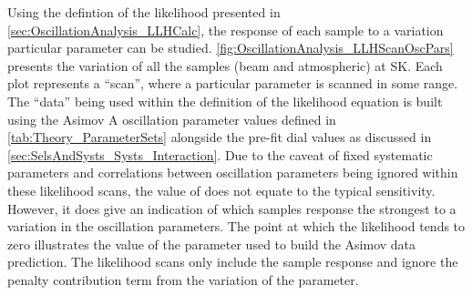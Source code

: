 Using the defintion of the likelihood presented in \autoref{sec:OscillationAnalysis_LLHCalc}, the response of each sample to a variation particular parameter can be studied. \autoref{fig:OscillationAnalysis_LLHScanOscPars} presents the variation of all the samples (beam and atmospheric) at SK. Each plot represents a ``scan'', where a particular parameter is scanned in some range. The ``data'' being used within the definition of the likelihood equation is built using the Asimov A oscillation parameter values defined in \autoref{tab:Theory_ParameterSets} alongside the pre-fit dial values as discussed in \autoref{sec:SelsAndSysts_Systs_Interaction}. Due to the caveat of fixed systematic parameters and correlations between oscillation parameters being ignored within these likelihood scans, the value of  does not equate to the typical \quickmath{1\sigma} sensitivity. However, it does give an indication of which samples response the strongest to a variation in the oscillation parameters. The point at which the likelihood tends to zero illustrates the value of the parameter used to build the Asimov data prediction. The likelihood scans only include the sample response and ignore the penalty contribution term from the variation of the parameter.

